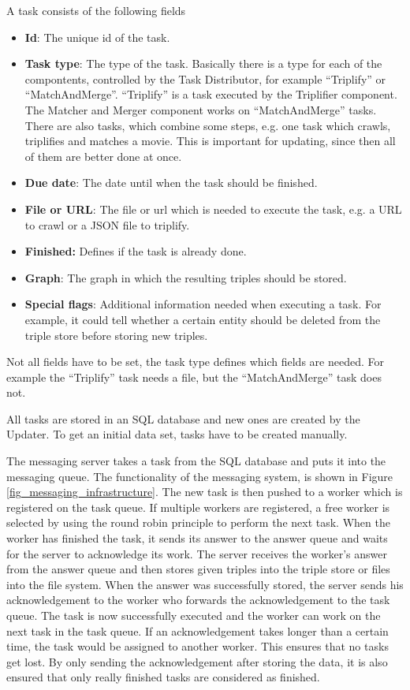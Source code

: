 A task consists of the following fields
\begin{itemize}
  \item \textbf{Id}:
  The unique id of the task.
  \item \textbf{Task type}:
   The type of the task.
  Basically there is a type for each of the compontents, controlled by the Task Distributor, for example ``Triplify'' or ``MatchAndMerge''.
  ``Triplify'' is a task executed by the Triplifier component.
  The Matcher and Merger component works on ``MatchAndMerge'' tasks.
  There are also tasks, which combine some steps, e.g. one task which crawls, triplifies and matches a movie. This is important for updating, since then all of them are better done at once.
  \item \textbf{Due date}:
  The date until when the task should be finished.
  \item \textbf{File or URL}:
  The file or url which is needed to execute the task, e.g. a URL to crawl or a JSON file to triplify.
  \item \textbf{Finished:}
  Defines if the task is already done.
  \item \textbf{Graph}:
  The graph in which the resulting triples should be stored.
  \item \textbf{Special flags}:
  Additional information needed when executing a task.
  For example, it could tell whether a certain entity should be deleted from the triple store before storing new triples.
\end{itemize}
Not all fields have to be set, the task type defines which fields are needed.
For example the ``Triplify'' task needs a file, but the ``MatchAndMerge'' task does not.

All tasks are stored in an SQL database and new ones are created by the Updater.
To get an initial data set, tasks have to be created manually.

The messaging server takes a task from the SQL database and puts it into the messaging queue.
The functionality of the messaging system, is shown in Figure \ref{fig_messaging_infrastructure}.
The new task is then pushed to a worker which is registered on the task queue.
If multiple workers are registered, a free worker is selected by using the round robin principle to perform the next task.
When the worker has finished the task, it sends its answer to the answer queue and waits for the server to acknowledge its work.
The server receives the worker's answer from the answer queue and then stores given triples into the triple store or files into the file system.
When the answer was successfully stored, the server sends his acknowledgement to the worker who forwards the acknowledgement to the task queue.
The task is now successfully executed and the worker can work on the next task in the task queue.
If an acknowledgement takes longer than a certain time, the task would be assigned to another worker.
This ensures that no tasks get lost.
By only sending the acknowledgement after storing the data, it is also ensured that only really finished tasks are considered as finished.

